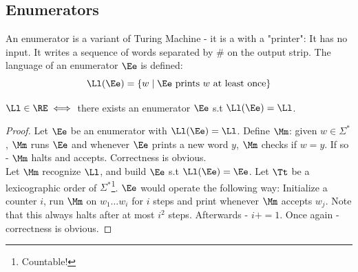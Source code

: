 \subsection{Enumerators}
An enumerator is a variant of Turing Machine - it is a \TM with a "printer": It has no input. It writes a sequence of words separated by $\#$ on the output strip. The language of an enumerator $\Ee$ is defined:\[
\Ll(\Ee) = \{w\mid \Ee\text{ prints }w\text{ at least once}\}\]
\begin{blueBox}
	\begin{thm}
		$\Ll\in \RE \iff$ there exists an enumerator $\Ee$ s.t $\Ll(\Ee) =\Ll$.
	\end{thm}
\end{blueBox}
\begin{proof}
	Let $\Ee$ be an enumerator with $\Ll(\Ee) = \Ll$. Define $\Mm$: given $w\in \Sigma^*$, $\Mm$ runs $\Ee$ and whenever $\Ee$ prints a new word $y$, $\Mm$ checks if $w = y$. If so - $\Mm$ halts and accepts. Correctness is obvious.\\
	Let $\Mm$ recognize $\Ll$, and build $\Ee$ s.t $\Ll(\Ee) = \Ee$. Let $\Tt$ be a lexicographic order of $\Sigma^*$\footnote{Countable!}. $\Ee$ would operate the following way:
	Initialize a counter $i$, run $\Mm$ on $w_1\ldots w_i$ for $i$ steps and print whenever $\Mm$ accepts $w_j$. Note that this always halts after at most $i^2$ steps. Afterwards - $i+=1$. Once again - correctness is obvious.
\end{proof}
